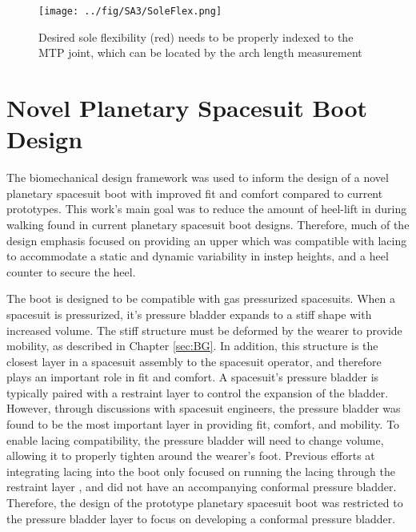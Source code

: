 \documentclass[defaultstyle,11pt]{thesis}
\begin{document}
\hypertarget{fig:SA3-SoleFlex}{%
\begin{figure}
\centering
\texttt{[image: ../fig/SA3/SoleFlex.png]}
\caption[{Desired sole flexibility which can be located by the arch length measurement}]{Desired sole flexibility (red) needs to be properly indexed to the MTP joint, which can be located by the arch length measurement}
\label{fig:SA3-SoleFlex}
\end{figure}
}

\hypertarget{novel-planetary-spacesuit-boot-design}{%
\section{Novel Planetary Spacesuit Boot Design}\label{novel-planetary-spacesuit-boot-design}}

The biomechanical design framework was used to inform the design of a novel planetary spacesuit boot with improved fit and comfort compared to current prototypes.
This work's main goal was to reduce the amount of heel-lift in during walking found in current planetary spacesuit boot designs.
Therefore, much of the design emphasis focused on providing an upper which was compatible with lacing to accommodate a static and dynamic variability in instep heights, and a heel counter to secure the heel.

The boot is designed to be compatible with gas pressurized spacesuits.
When a spacesuit is pressurized, it's pressure bladder expands to a stiff shape with increased volume.
The stiff structure must be deformed by the wearer to provide mobility, as described in Chapter \ref{sec:BG}.
In addition, this structure is the closest layer in a spacesuit assembly to the spacesuit operator, and therefore plays an important role in fit and comfort.
A spacesuit's pressure bladder is typically paired with a restraint layer to control the expansion of the bladder\citep{Harris2001}.
However, through discussions with spacesuit engineers, the pressure bladder was found to be the most important layer in providing fit, comfort, and mobility.
To enable lacing compatibility, the pressure bladder will need to change volume, allowing it to properly tighten around the wearer's foot.
Previous efforts at integrating lacing into the boot only focused on running the lacing through the restraint layer \citep{Graziosi2016}, and did not have an accompanying conformal pressure bladder.
Therefore, the design of the prototype planetary spacesuit boot was restricted to the pressure bladder layer to focus on developing a conformal pressure bladder.
\end{document}
